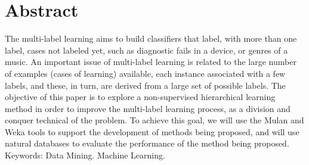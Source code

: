 
\chapter*{Abstract}

The multi-label learning aims to build classifiers that label, with more than one label, cases not labeled yet, such as diagnostic fails in a device, or genres of a music. An important issue of multi-label learning is related to the large number of examples (cases of learning) available, each instance associated with a few labels, and these, in turn, are derived from a large set of possible labels. The objective of this paper is to explore a non-supervised hierarchical learning method in order to improve the multi-label learning process, as a division and conquer technical of the problem. To achieve this goal, we will use the Mulan and Weka tools to support the development of methods being proposed, and will use natural databases to evaluate the performance of the method being proposed.\\

Keywords: Data Mining. Machine Learning.
